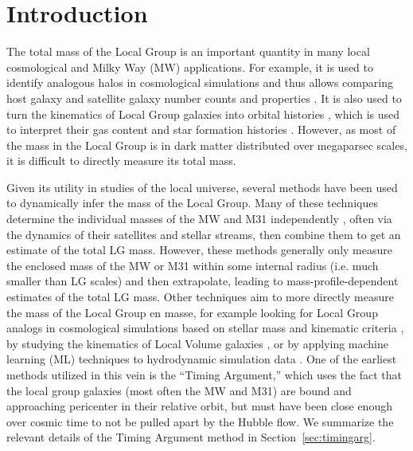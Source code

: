 \documentclass[twocolumn]{aastex631}
\begin{document}
\section{Introduction}
\label{sec:intro}
The total mass of the Local Group is an important quantity in many local
cosmological and Milky Way (MW) applications.
For example, it is used to identify analogous halos in cosmological simulations
and thus allows comparing host galaxy and satellite galaxy number counts and
properties \citep[e.g.,][]{Patel2017a, Marinacci:2017, Dooley2017, Besla2018,
Patel2018, Garrison-Kimmel:2019a, Garrison-Kimmel:2019b, Sawala2022}.
It is also used to turn the kinematics of Local Group
galaxies into orbital histories \citep[e.g.,][]{Peebles:2017}, which is used to
interpret their gas content \citep[e.g.,][]{Fillingham:2018,Putman:2021} and
star formation histories \citep[e.g.,][]{Tolstoy:2009}.
However, as most of the mass in the Local Group is in dark matter distributed
over megaparsec scales, it is difficult to directly measure its total mass.

Given its utility in studies of the local universe, several methods have been
used to dynamically infer the mass of the Local Group.
Many of these techniques determine the individual masses of the MW and M31
independently \citep[e.g.][]{Watkins2010, Fardal2013,Diaz2014,Carlesi2017,
Patel2018, Eadie:2019, Fritz:2020, Deason:2021, Villanueva-Domingo2021,
Wang:2022}, often via the dynamics of their satellites
and stellar streams, then combine them to get an estimate of the total LG mass.
However, these methods generally only measure the enclosed mass of the MW or M31
within some internal radius (i.e. much smaller than LG scales) and then
extrapolate, leading to mass-profile-dependent estimates of the total LG mass.
Other techniques aim to more directly measure the mass of the Local Group en
masse, for example looking for Local Group analogs in cosmological simulations
based on stellar mass and kinematic criteria
\citep[e.g.,][]{LiWhite2008, Gonzalez2014, Hartl2021, Zhai2020},
by studying the kinematics of Local Volume galaxies
\citep[e.g.,][]{Diaz2014,Penarrubia2014}, or by applying machine learning (ML)
techniques to hydrodynamic simulation data
\citep[e.g.,][]{McLeod2017,Villanueva-Domingo2021}.
One of the earliest methods utilized in this vein is the ``Timing Argument,''
which uses the fact that the local group galaxies (most often the MW and M31)
are bound and approaching pericenter in their relative orbit, but must have been
close enough over cosmic time to not be pulled apart by the Hubble flow. We
summarize the relevant details of the Timing Argument method in
Section~\ref{sec:timingarg}.
\end{document}
